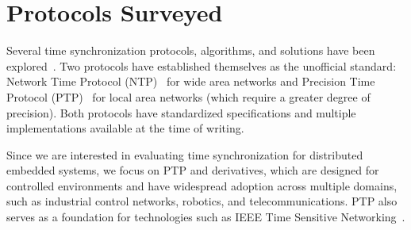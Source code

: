
\section{Protocols Surveyed} %
\label{sec:background}

Several time synchronization protocols, algorithms, and solutions
have been explored~\cite{ntpv4-spec, sntp-spec, linuxptp, time-protocol-flooding, time-protocol-pulsesync, white-rabbit, time-protocol-wsn, time-protocol-low-power}.
Two protocols have established themselves as the unofficial standard:
Network Time Protocol (NTP)~\cite{ntpv4-spec} for wide area networks %
and Precision Time Protocol (PTP)~\cite{ptp-spec} for local area networks %
(which require a greater degree of precision).
Both protocols have standardized specifications and multiple implementations
available at the time of writing.

Since we are interested in evaluating time synchronization for distributed
embedded systems,
we focus on PTP and derivatives,
which are designed for controlled environments
and have widespread adoption across multiple domains,
such as industrial control networks, robotics, and telecommunications.
PTP also serves as a foundation for technologies such as
IEEE Time Sensitive Networking~\cite{??}.


